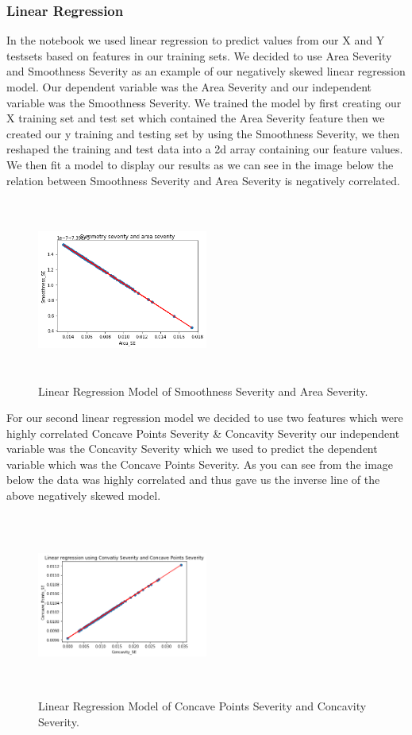 \documentclass[conference]{IEEEtran}
\begin{document}
\subsubsection{Linear Regression}
In the notebook we used linear regression to predict values from our X and Y testsets based on features in our training sets.  We decided to use  Area Severity  and Smoothness Severity as an example of our negatively skewed linear regression model.  Our dependent variable was the Area Severity and our independent variable was the Smoothness Severity.   We trained the model by first creating our X training set and test set which contained the Area Severity feature then we created our y training and testing set by using the Smoothness Severity, we then reshaped the training and test data into a 2d array containing our feature values.  We then fit a model to display our results as we can see in the image below the relation between Smoothness Severity and Area Severity is negatively correlated.
\begin{figure}[H]
\caption{Linear Regression Model of Smoothness Severity and Area Severity.}
\centering
\includegraphics[height=60mm,width=0.5\textwidth]{Images/negatively_skewed_linear_regression.png}
\end{figure}
For our second linear regression model we decided to use two features which were highly correlated Concave Points Severity \& Concavity Severity our independent variable was the  Concavity Severity which we used to predict the dependent variable which was the Concave Points Severity.  As you can see from the image below the data was highly correlated and thus gave us the inverse line of the above negatively skewed model.
\begin{figure}[H]
\caption{Linear Regression Model of Concave Points Severity and Concavity Severity.}
\centering
\includegraphics[height=60mm,width=0.5\textwidth]{Images/positively_skewed_linear_regression.png}
\end{figure}
\end{document}
